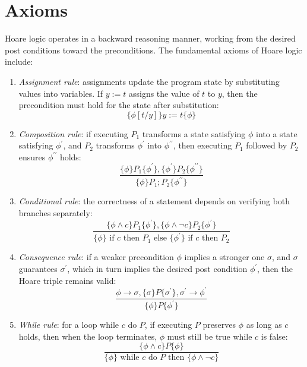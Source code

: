 \section{Axioms}

Hoare logic operates in a backward reasoning manner, working from the desired post conditions toward the preconditions. 
The fundamental axioms of Hoare logic include:
\begin{enumerate}
    \item \textit{Assignment rule}: assignments update the program state by substituting values into variables. 
        If $y:=t$ assigns the value of $t$ to $y$, then the precondition must hold for the state after substitution:
        \[\{\phi[t/y]\} y:=t \{\phi\}\]
    \item \textit{Composition rule}: if executing $P_1$ transforms a state satisfying $\phi$ into a state satisfying $\phi^\prime$, and $P_2$ transforms $\phi^\prime$ into $\phi^{\prime\prime}$, then executing $P_1$ followed by $P_2$ ensures $\phi^{\prime\prime}$ holds:
        \[\dfrac{\{\phi\} P_1 \{\phi^\prime\},\{\phi^\prime\} P_2 \{\phi^{\prime\prime}\}}{\{\phi\} P_1;P_2 \{\phi^{\prime\prime}\}}\]
    \item \textit{Conditional rule}: the correctness of a statement depends on verifying both branches separately:
         \[\dfrac{\{\phi \land c\} P_1 \{\phi^\prime\}, \{\phi\land\lnot c\} P_2 \{\phi^\prime\}}{\{\phi\} \text{ if }c\text{ then }P_1\text{ else }\{\phi^\prime\}\text{ if }c\text{ then }P_2}\]
    \item \textit{Consequence rule}: if a weaker precondition $\phi$ implies a stronger one $\sigma$, and $\sigma$ guarantees $\sigma^\prime$, which in turn implies the desired post condition $\phi^\prime$, then the Hoare triple remains valid:
        \[\dfrac{\phi\rightarrow \sigma, \{\sigma\} P \{\sigma^\prime\}, \sigma^\prime\rightarrow \phi^\prime}{\{\phi\} P \{\phi^\prime\}}\]
    \item \textit{While rule}: for a loop while $c$ do $P$, if executing $P$ preserves $\phi$ as long as $c$ holds, then when the loop terminates, $\phi$ must still be true while $c$ is false:
        \[\dfrac{\{\phi \land c\} P \{\phi\}}{\{\phi\}\text{ while }c\text{ do }P\text{ then }\{\phi \land\lnot c\}}\]
\end{enumerate}

